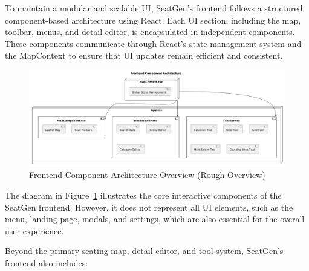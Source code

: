 To maintain a modular and scalable UI, SeatGen’s frontend follows a structured component-based architecture using React. Each UI section, including the map, toolbar, menus, and detail editor, is encapsulated in independent components. These components communicate through React’s state management system and the MapContext to ensure that UI updates remain efficient and consistent.

\begin{figure}[H]
    \begin{center}
        \includegraphics[scale=0.35]{pics/frontend_architecture.png}
    \end{center}
    \caption{Frontend Component Architecture Overview (Rough Overview)}
    \label{fig:frontend-architecture}
\end{figure}

The diagram in Figure~\ref{fig:frontend-architecture} illustrates the core interactive components of the SeatGen frontend. However, it does not represent all UI elements, such as the menu, landing page, modals, and settings, which are also essential for the overall user experience.

Beyond the primary seating map, detail editor, and tool system, SeatGen's frontend also includes:

